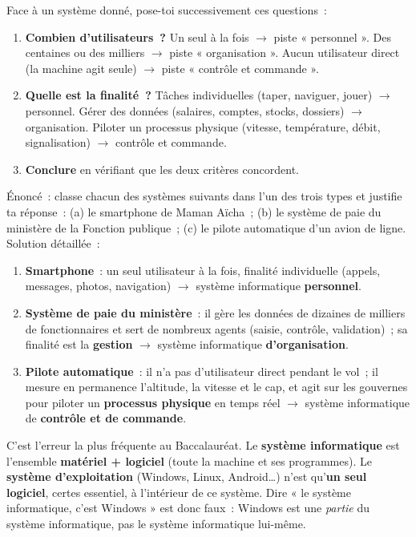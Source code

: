 \documentclass[11pt]{article}
\begin{document}
\begin{methode}
Face à un système donné, pose-toi successivement ces questions~:
\begin{enumerate}
  \item \textbf{Combien d'utilisateurs~?} Un seul à la fois $\rightarrow$ piste « personnel ». Des centaines ou des milliers $\rightarrow$ piste « organisation ». Aucun utilisateur direct (la machine agit seule) $\rightarrow$ piste « contrôle et commande ».
  \item \textbf{Quelle est la finalité~?} Tâches individuelles (taper, naviguer, jouer) $\rightarrow$ personnel. Gérer des données (salaires, comptes, stocks, dossiers) $\rightarrow$ organisation. Piloter un processus physique (vitesse, température, débit, signalisation) $\rightarrow$ contrôle et commande.
  \item \textbf{Conclure} en vérifiant que les deux critères concordent.
\end{enumerate}
\end{methode}

\begin{exoresolu}
Énoncé~: classe chacun des systèmes suivants dans l'un des trois types et justifie ta réponse~: (a) le smartphone de Maman Aïcha~; (b) le système de paie du ministère de la Fonction publique~; (c) le pilote automatique d'un avion de ligne.
\tcblower
Solution détaillée~:
\begin{enumerate}
  \item \textbf{Smartphone}~: un seul utilisateur à la fois, finalité individuelle (appels, messages, photos, navigation) $\rightarrow$ système informatique \textbf{personnel}.
  \item \textbf{Système de paie du ministère}~: il gère les données de dizaines de milliers de fonctionnaires et sert de nombreux agents (saisie, contrôle, validation)~; sa finalité est la \textbf{gestion} $\rightarrow$ système informatique \textbf{d'organisation}.
  \item \textbf{Pilote automatique}~: il n'a pas d'utilisateur direct pendant le vol~; il mesure en permanence l'altitude, la vitesse et le cap, et agit sur les gouvernes pour piloter un \textbf{processus physique} en temps réel $\rightarrow$ système informatique de \textbf{contrôle et de commande}.
\end{enumerate}
\end{exoresolu}

\begin{attention}
C'est l'erreur la plus fréquente au Baccalauréat. Le \textbf{système informatique} est l'ensemble \textbf{matériel + logiciel} (toute la machine et ses programmes). Le \textbf{système d'exploitation} (Windows, Linux, Android\ldots) n'est qu'\textbf{un seul logiciel}, certes essentiel, à l'intérieur de ce système. Dire « le système informatique, c'est Windows » est donc faux~: Windows est une \emph{partie} du système informatique, pas le système informatique lui-même.
\end{attention}
\end{document}
